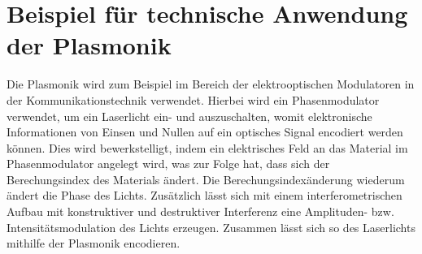 
\section{Beispiel für technische Anwendung der Plasmonik}
\label{sec:usage}

Die Plasmonik wird zum Beispiel im Bereich der elektrooptischen Modulatoren in der Kommunikationstechnik verwendet. Hierbei wird ein Phasenmodulator verwendet, um ein Laserlicht ein- und auszuschalten, womit elektronische Informationen von Einsen und Nullen auf ein optisches Signal encodiert werden können. Dies wird bewerkstelligt, indem ein elektrisches Feld an das Material im Phasenmodulator angelegt wird, was zur Folge hat, dass sich der Berechungsindex des Materials ändert. Die Berechungsindexänderung wiederum ändert die Phase des Lichts. Zusätzlich lässt sich mit einem interferometrischen Aufbau mit konstruktiver und destruktiver Interferenz eine Amplituden- bzw. Intensitätsmodulation des Lichts erzeugen. Zusammen lässt sich so des Laserlichts mithilfe der Plasmonik encodieren. \cite{Anwendung} 